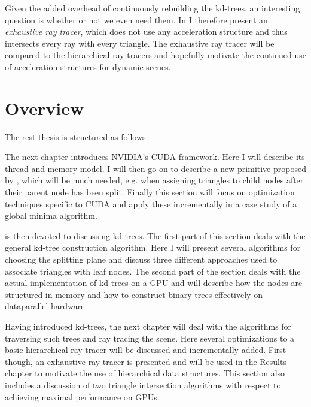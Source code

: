 Given the added overhead of continuously rebuilding the kd-trees, an interesting
question is whether or not we even need them. In  I
therefore present an \textit{exhaustive ray tracer}, which does not use any
acceleration structure and thus intersects every ray with every triangle. The
exhaustive ray tracer will be compared to the hierarchical ray tracers and
hopefully motivate the continued use of acceleration structures for dynamic
scenes.

\section{Overview}

The rest thesis is structured as follows:




The next chapter introduces NVIDIA's CUDA framework. Here I will describe its
thread and memory model. I will then go on to describe a new primitive proposed
by \sengupta{}, which will be much needed, e.g. when assigning triangles to
child nodes after their parent node has been split. Finally this section will
focus on optimization techniques specific to CUDA and apply these incrementally
in a case study of a global minima algorithm.


 is then devoted to discussing kd-trees. The first part
of this section deals with the general kd-tree construction algorithm. Here I
will present several algorithms for choosing the splitting plane and discuss
three different approaches used to associate triangles with leaf nodes. The
second part of the section deals with the actual implementation of kd-trees on a
GPU and will describe how the nodes are structured in memory and how to
construct binary trees effectively on dataparallel hardware.


Having introduced kd-trees, the next chapter will deal with the algorithms for
traversing such trees and ray tracing the scene. Here several optimizations to a
basic hierarchical ray tracer will be discussed and incrementally added. First
though, an exhaustive ray tracer is presented and will be used in the Results
chapter to motivate the use of hierarchical data structures. This section also
includes a discussion of two triangle intersection algorithms with respect to
achieving maximal performance on GPUs.

